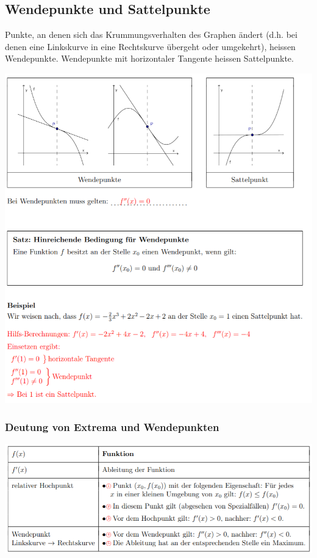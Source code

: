 \subsection{Wendepunkte und Sattelpunkte}
Punkte, an denen sich das Krummungsverhalten des Graphen ändert (d.h. bei denen eine Linkskurve in eine Rechtskurve übergeht oder umgekehrt), heissen Wendepunkte. Wendepunkte mit horizontaler Tangente heissen Sattelpunkte.
\begin{center}
    \includegraphics[width=1\linewidth]{images/wendepunkt.png}
\end{center}

\subsubsection{Deutung von Extrema und Wendepunkten}
\begin{center}
    \includegraphics[width=1\linewidth]{images/deutungwendepunkte.png}
\end{center}

